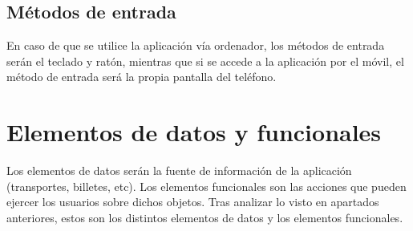 \subsection{Métodos de entrada}
En caso de que se utilice la aplicación vía ordenador, los métodos de entrada
serán el teclado y ratón, mientras que si se accede a la aplicación por el
móvil, el método de entrada será la propia pantalla del teléfono.

\section{Elementos de datos y funcionales}

Los elementos de datos serán la fuente de información de la aplicación
(transportes, billetes, etc). Los elementos funcionales son las acciones que
pueden ejercer los usuarios sobre dichos objetos. Tras analizar lo visto en
apartados anteriores, estos son los distintos elementos de datos y los
elementos funcionales.